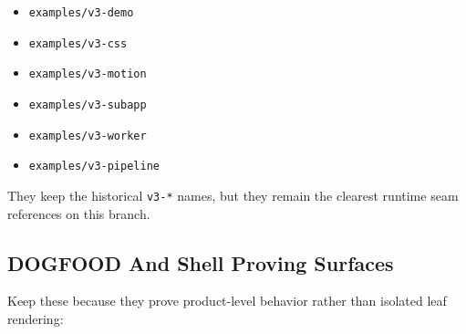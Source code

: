 \begin{itemize}
\tightlist
\item
  \texttt{e\allowbreak{}x\allowbreak{}a\allowbreak{}m\allowbreak{}p\allowbreak{}l\allowbreak{}e\allowbreak{}s\allowbreak{}/\allowbreak{}v\allowbreak{}3\allowbreak{}-\allowbreak{}d\allowbreak{}e\allowbreak{}m\allowbreak{}o}
\item
  \texttt{e\allowbreak{}x\allowbreak{}a\allowbreak{}m\allowbreak{}p\allowbreak{}l\allowbreak{}e\allowbreak{}s\allowbreak{}/\allowbreak{}v\allowbreak{}3\allowbreak{}-\allowbreak{}c\allowbreak{}s\allowbreak{}s}
\item
  \texttt{e\allowbreak{}x\allowbreak{}a\allowbreak{}m\allowbreak{}p\allowbreak{}l\allowbreak{}e\allowbreak{}s\allowbreak{}/\allowbreak{}v\allowbreak{}3\allowbreak{}-\allowbreak{}m\allowbreak{}o\allowbreak{}t\allowbreak{}i\allowbreak{}o\allowbreak{}n}
\item
  \texttt{e\allowbreak{}x\allowbreak{}a\allowbreak{}m\allowbreak{}p\allowbreak{}l\allowbreak{}e\allowbreak{}s\allowbreak{}/\allowbreak{}v\allowbreak{}3\allowbreak{}-\allowbreak{}s\allowbreak{}u\allowbreak{}b\allowbreak{}a\allowbreak{}p\allowbreak{}p}
\item
  \texttt{e\allowbreak{}x\allowbreak{}a\allowbreak{}m\allowbreak{}p\allowbreak{}l\allowbreak{}e\allowbreak{}s\allowbreak{}/\allowbreak{}v\allowbreak{}3\allowbreak{}-\allowbreak{}w\allowbreak{}o\allowbreak{}r\allowbreak{}k\allowbreak{}e\allowbreak{}r}
\item
  \texttt{e\allowbreak{}x\allowbreak{}a\allowbreak{}m\allowbreak{}p\allowbreak{}l\allowbreak{}e\allowbreak{}s\allowbreak{}/\allowbreak{}v\allowbreak{}3\allowbreak{}-\allowbreak{}p\allowbreak{}i\allowbreak{}p\allowbreak{}e\allowbreak{}l\allowbreak{}i\allowbreak{}n\allowbreak{}e}
\end{itemize}

They keep the historical \texttt{v\allowbreak{}3\allowbreak{}-\allowbreak{}*} names, but they remain the clearest runtime seam references on this branch.

\subsection{DOGFOOD And Shell Proving Surfaces}\label{record-007-dogfood-and-shell-proving-surfaces}

Keep these because they prove product-level behavior rather than isolated leaf rendering:

